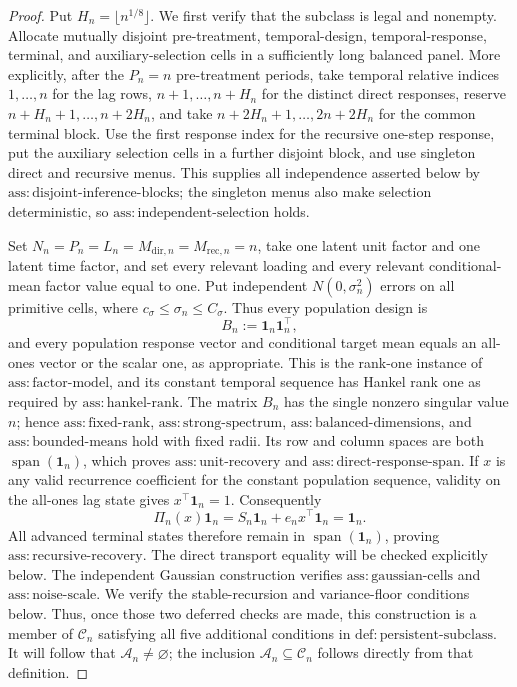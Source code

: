 \documentclass{article}
\begin{document}
\begin{proof}
Put \(H_n=\lfloor n^{1/8}\rfloor\).  We first verify that the subclass is legal and nonempty.  Allocate mutually disjoint pre-treatment, temporal-design, temporal-response, terminal, and auxiliary-selection cells in a sufficiently long balanced panel.  More explicitly, after the \(P_n=n\) pre-treatment periods, take temporal relative indices \(1,\ldots,n\) for the lag rows, \(n+1,\ldots,n+H_n\) for the distinct direct responses, reserve \(n+H_n+1,\ldots,n+2H_n\), and take \(n+2H_n+1,\ldots,2n+2H_n\) for the common terminal block.  Use the first response index for the recursive one-step response, put the auxiliary selection cells in a further disjoint block, and use singleton direct and recursive menus.  This supplies all independence asserted below by \(\mathrm{ass{:}disjoint\mbox{-}inference\mbox{-}blocks}\); the singleton menus also make selection deterministic, so \(\mathrm{ass{:}independent\mbox{-}selection}\) holds.

Set \(N_n=P_n=L_n=M_{\mathrm{dir},n}=M_{\mathrm{rec},n}=n\), take one latent unit factor and one latent time factor, and set every relevant loading and every relevant conditional-mean factor value equal to one.  Put independent \(N(0,\sigma_n^2)\) errors on all primitive cells, where \(c_\sigma\leq\sigma_n\leq C_\sigma\).  Thus every population design is
\[
 B_n:=\boldsymbol 1_n\boldsymbol 1_n^{\top},
\]
and every population response vector and conditional target mean equals an all-ones vector or the scalar one, as appropriate.  This is the rank-one instance of \(\mathrm{ass{:}factor\mbox{-}model}\), and its constant temporal sequence has Hankel rank one as required by \(\mathrm{ass{:}hankel\mbox{-}rank}\).  The matrix \(B_n\) has the single nonzero singular value \(n\); hence \(\mathrm{ass{:}fixed\mbox{-}rank}\), \(\mathrm{ass{:}strong\mbox{-}spectrum}\), \(\mathrm{ass{:}balanced\mbox{-}dimensions}\), and \(\mathrm{ass{:}bounded\mbox{-}means}\) hold with fixed radii.  Its row and column spaces are both \(\operatorname{span}(\boldsymbol 1_n)\), which proves \(\mathrm{ass{:}unit\mbox{-}recovery}\) and \(\mathrm{ass{:}direct\mbox{-}response\mbox{-}span}\).  If \(x\) is any valid recurrence coefficient for the constant population sequence, validity on the all-ones lag state gives \(x^{\top}\boldsymbol 1_n=1\).  Consequently
\[
 \Pi_n(x)\boldsymbol 1_n
 =S_n\boldsymbol 1_n+e_nx^{\top}\boldsymbol 1_n
 =\boldsymbol 1_n.
\]
All advanced terminal states therefore remain in \(\operatorname{span}(\boldsymbol 1_n)\), proving \(\mathrm{ass{:}recursive\mbox{-}recovery}\).  The direct transport equality will be checked explicitly below.  The independent Gaussian construction verifies \(\mathrm{ass{:}gaussian\mbox{-}cells}\) and \(\mathrm{ass{:}noise\mbox{-}scale}\).  We verify the stable-recursion and variance-floor conditions below.  Thus, once those two deferred checks are made, this construction is a member of \(\mathcal C_n\) satisfying all five additional conditions in \(\mathrm{def{:}persistent\mbox{-}subclass}\).  It will follow that \(\mathcal A_n\neq\varnothing\); the inclusion \(\mathcal A_n\subseteq\mathcal C_n\) follows directly from that definition.


\end{proof}
\end{document}
